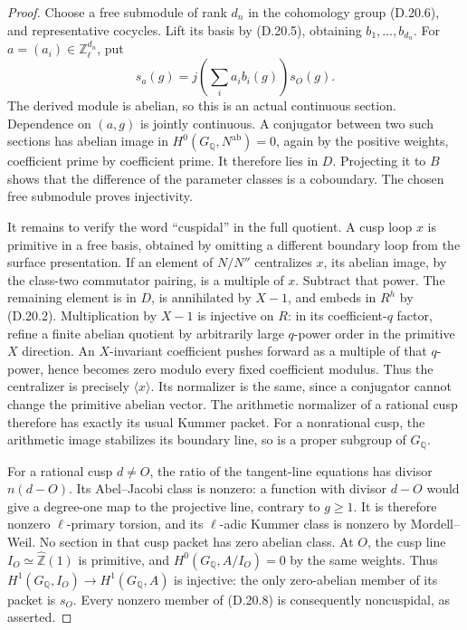 \begin{proof}
Choose a free submodule of rank \(d_n\) in the
cohomology group (D.20.6), and representative
cocycles. Lift its basis by (D.20.5), obtaining
\(b_1,\ldots,b_{d_n}\). For
\(a=(a_i)\in\mathbb Z_\ell^{d_n}\), put
\[
 s_a(g)=j\left(\sum_i a_i b_i(g)\right)s_O(g).        \tag{D.20.8}
\]
The derived module is abelian, so this is an actual
continuous section. Dependence on \((a,g)\) is
jointly continuous. A conjugator between two such
sections has abelian image in
\(H^0(G_{\mathbb Q},N^{\mathrm{ab}})=0\), again by
the positive weights, coefficient prime by
coefficient prime. It therefore lies in \(D\).
Projecting it to \(B\) shows that the difference
of the parameter classes is a coboundary.
The chosen free submodule proves injectivity.

It remains to verify the word ``cuspidal'' in the
full quotient. A cusp loop \(x\) is primitive
in a free basis, obtained by omitting a different
boundary loop from the surface presentation.
If an element of \(N/N''\) centralizes \(x\),
its abelian image, by the class-two commutator
pairing, is a multiple of \(x\). Subtract that
power. The remaining element is in \(D\), is
annihilated by \(X-1\), and embeds in \(R^h\)
by (D.20.2). Multiplication by \(X-1\) is injective
on \(R\): in its coefficient-\(q\) factor, refine
a finite abelian quotient by arbitrarily large
\(q\)-power order in the primitive \(X\) direction.
An \(X\)-invariant coefficient pushes forward as
a multiple of that \(q\)-power, hence becomes
zero modulo every fixed coefficient modulus.
Thus the centralizer is precisely \(\langle x\rangle\).
Its normalizer is the same, since a conjugator
cannot change the primitive abelian vector.
The arithmetic normalizer of a rational cusp
therefore has exactly its usual Kummer packet.
For a nonrational cusp, the arithmetic image
stabilizes its boundary line, so is a proper
subgroup of \(G_{\mathbb Q}\).

For a rational cusp \(d\ne O\), the ratio of
the tangent-line equations has divisor \(n(d-O)\).
Its Abel--Jacobi class is nonzero: a function
with divisor \(d-O\) would give a degree-one
map to the projective line, contrary to \(g\ge1\).
It is therefore nonzero \(\ell\)-primary torsion,
and its \(\ell\)-adic Kummer class is nonzero
by Mordell--Weil. No section in that cusp packet
has zero abelian class. At \(O\), the cusp line
\(I_O\simeq\widehat{\mathbb Z}(1)\) is primitive,
and \(H^0(G_{\mathbb Q},A/I_O)=0\) by the same
weights. Thus \(H^1(G_{\mathbb Q},I_O)\to
H^1(G_{\mathbb Q},A)\) is injective: the only
zero-abelian member of its packet is \(s_O\).
Every nonzero member of (D.20.8) is consequently
noncuspidal, as asserted.
\end{proof}

